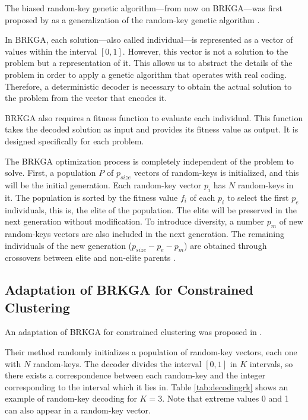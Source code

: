 \documentclass[review]{elsarticle}
\begin{document}
The biased random-key genetic algorithm---from now on BRKGA---was first proposed by \cite{gonccalves2011biased} as a generalization of the random-key genetic algorithm \cite{bean1994genetic}.

In BRKGA, each solution---also called individual---is represented as a vector of values within the interval $[0,1]$. However, this vector is not a solution to the problem but a representation of it. This allows us to abstract the details of the problem in order to apply a genetic algorithm that operates with real coding. Therefore, a deterministic decoder is necessary to obtain the actual solution to the problem from the vector that encodes it.

BRKGA also requires a fitness function to evaluate each individual. This function takes the decoded solution as input and provides its fitness value as output. It is designed specifically for each problem.

The BRKGA optimization process is completely independent of the problem to solve. First, a population $P$ of $p_{size}$ vectors of random-keys is initialized, and this will be the initial generation. Each random-key vector $p_i$ has $N$ random-keys in it. The population is sorted by the fitness value $f_i$ of each $p_i$ to select the first $p_e$ individuals, this is, the elite of the population. The elite will be preserved in the next generation without modification. To introduce diversity, a number $p_m$ of new random-keys vectors are also included in the next generation. The remaining individuals of the new generation ($p_{size} - p_e - p_m$) are obtained through crossovers between elite and non-elite parents \cite{de2017comparison}.

\subsection{Adaptation of BRKGA for Constrained Clustering} \label{sec:AdaptationofBRKGA}

An adaptation of BRKGA for constrained clustering was proposed in \cite{de2017comparison}.

Their method randomly initializes a population of random-key vectors, each one with $N$ random-keys. The decoder divides the interval $[0,1]$ in $K$ intervals, so there exists a correspondence between each random-key and the integer corresponding to the interval which it lies in. Table \ref{tab:decodingrk} shows an example of random-key decoding for $K = 3$. Note that extreme values 0 and 1 can also appear in a random-key vector.
\end{document}
